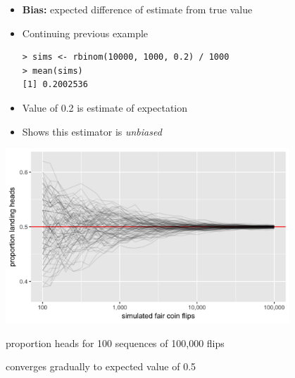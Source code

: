 \documentclass[10pt]{report}
\begin{document}
%
\begin{itemize}
\item {\bfseries Bias:} expected difference of estimate from true value
\item Continuing previous example
{\small
\begin{Verbatim}
> sims <- rbinom(10000, 1000, 0.2) / 1000
> mean(sims)
[1] 0.2002536
\end{Verbatim}
}
\item Value of 0.2 is estimate of expectation
\item Shows this estimator is \emph{unbiased}
\end{itemize}


%
\vspace*{-3pt}
\begin{center}
\vspace*{-3pt}
\includegraphics[width=0.8\textwidth]{img/coin-flip-clt.png}
\end{center}
\vspace*{-8pt}
\begin{subitemize}
\item proportion heads for 100 sequences of 100,000 flips
\vspace*{-2pt}
\item converges gradually to expected value of 0.5
\end{subitemize}
\end{document}
